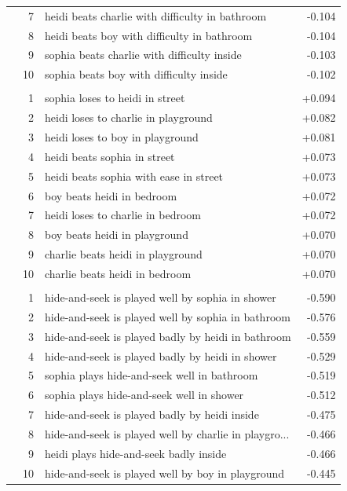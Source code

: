 \begin{longtable}{@{}lrlr@{}}
 & 7 & heidi beats charlie with difficulty in bathroom & -0.104 \\
 & 8 & heidi beats boy with difficulty in bathroom & -0.104 \\
 & 9 & sophia beats charlie with difficulty inside & -0.103 \\
 & 10 & sophia beats boy with difficulty inside & -0.102 \\
\addlinespace[3pt]
\multicolumn{4}{l}{\textit{Sentence -- Easiest}} \\
 & 1 & sophia loses to heidi in street & +0.094 \\
 & 2 & heidi loses to charlie in playground & +0.082 \\
 & 3 & heidi loses to boy in playground & +0.081 \\
 & 4 & heidi beats sophia in street & +0.073 \\
 & 5 & heidi beats sophia with ease in street & +0.073 \\
 & 6 & boy beats heidi in bedroom & +0.072 \\
 & 7 & heidi loses to charlie in bedroom & +0.072 \\
 & 8 & boy beats heidi in playground & +0.070 \\
 & 9 & charlie beats heidi in playground & +0.070 \\
 & 10 & charlie beats heidi in bedroom & +0.070 \\
\addlinespace
\multicolumn{4}{l}{\textit{Complex Event -- Hardest}} \\
 & 1 & hide-and-seek is played well by sophia in shower & -0.590 \\
 & 2 & hide-and-seek is played well by sophia in bathroom & -0.576 \\
 & 3 & hide-and-seek is played badly by heidi in bathroom & -0.559 \\
 & 4 & hide-and-seek is played badly by heidi in shower & -0.529 \\
 & 5 & sophia plays hide-and-seek well in bathroom & -0.519 \\
 & 6 & sophia plays hide-and-seek well in shower & -0.512 \\
 & 7 & hide-and-seek is played badly by heidi inside & -0.475 \\
 & 8 & hide-and-seek is played well by charlie in playgro... & -0.466 \\
 & 9 & heidi plays hide-and-seek badly inside & -0.466 \\
 & 10 & hide-and-seek is played well by boy in playground & -0.445 \\

\end{longtable}
